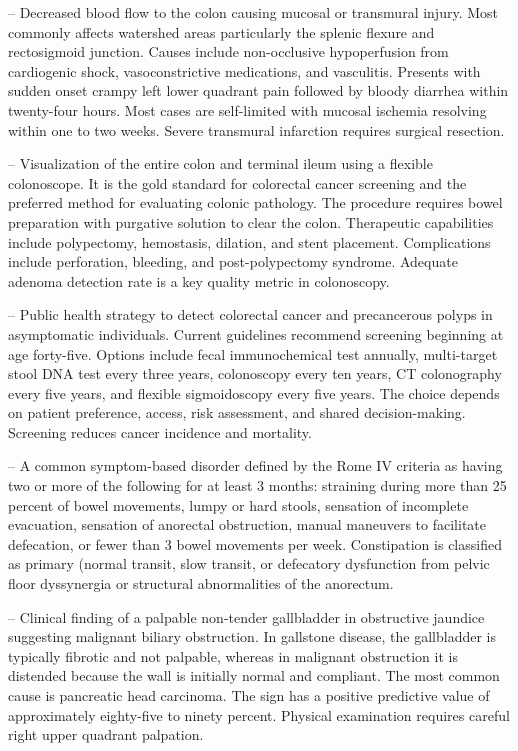 -- Decreased blood flow to the colon causing mucosal or transmural injury. Most commonly affects watershed areas particularly the splenic flexure and rectosigmoid junction. Causes include non-occlusive hypoperfusion from cardiogenic shock, vasoconstrictive medications, and vasculitis. Presents with sudden onset crampy left lower quadrant pain followed by bloody diarrhea within twenty-four hours. Most cases are self-limited with mucosal ischemia resolving within one to two weeks. Severe transmural infarction requires surgical resection.

-- Visualization of the entire colon and terminal ileum using a flexible colonoscope. It is the gold standard for colorectal cancer screening and the preferred method for evaluating colonic pathology. The procedure requires bowel preparation with purgative solution to clear the colon. Therapeutic capabilities include polypectomy, hemostasis, dilation, and stent placement. Complications include perforation, bleeding, and post-polypectomy syndrome. Adequate adenoma detection rate is a key quality metric in colonoscopy.

-- Public health strategy to detect colorectal cancer and precancerous polyps in asymptomatic individuals. Current guidelines recommend screening beginning at age forty-five. Options include fecal immunochemical test annually, multi-target stool DNA test every three years, colonoscopy every ten years, CT colonography every five years, and flexible sigmoidoscopy every five years. The choice depends on patient preference, access, risk assessment, and shared decision-making. Screening reduces cancer incidence and mortality.

-- A common symptom-based disorder defined by the Rome IV criteria as having two or more of the following for at least 3 months: straining during more than 25 percent of bowel movements, lumpy or hard stools, sensation of incomplete evacuation, sensation of anorectal obstruction, manual maneuvers to facilitate defecation, or fewer than 3 bowel movements per week. Constipation is classified as primary (normal transit, slow transit, or defecatory dysfunction from pelvic floor dyssynergia or structural abnormalities of the anorectum.

-- Clinical finding of a palpable non-tender gallbladder in obstructive jaundice suggesting malignant biliary obstruction. In gallstone disease, the gallbladder is typically fibrotic and not palpable, whereas in malignant obstruction it is distended because the wall is initially normal and compliant. The most common cause is pancreatic head carcinoma. The sign has a positive predictive value of approximately eighty-five to ninety percent. Physical examination requires careful right upper quadrant palpation.

